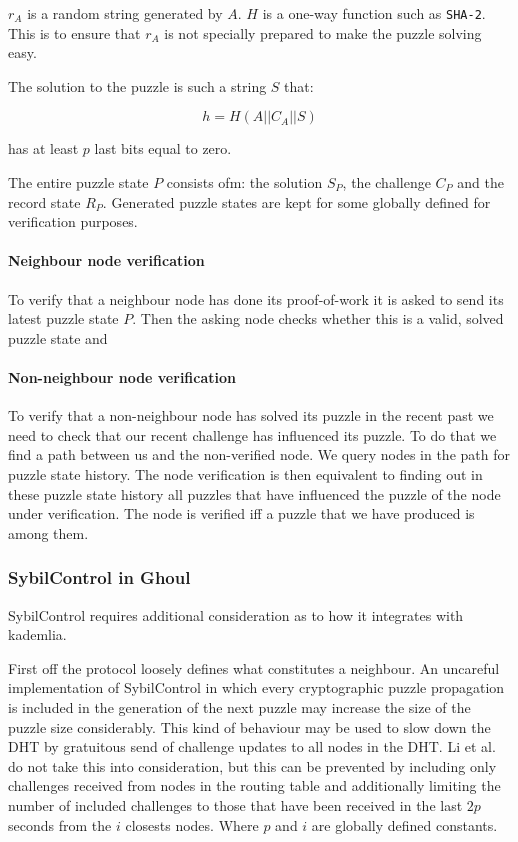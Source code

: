   $r_A$ is a random string generated by $A$. $H$ is a one-way function such as
  \texttt{SHA-2}. This is to ensure that $r_A$ is not specially prepared to make
  the puzzle solving easy.

  The solution to the puzzle is such a string $S$ that:

  \[ h = H\left(A||C_A||S\right)\]

  has at least $p$ last bits equal to zero.

  The entire puzzle state $P$ consists ofm: the solution $S_P$, the challenge
  $C_P$ and the record state $R_P$. Generated puzzle states are kept for some
  globally defined for verification purposes.

  \paragraph{Neighbour node verification}
  To verify that a neighbour node has done its proof-of-work it is asked to send
  its latest puzzle state $P$. Then the asking node checks whether this is a
  valid, solved puzzle state and 

  \paragraph{Non-neighbour node verification}
  To verify that a non-neighbour node has solved its puzzle in the recent past we
  need to check that our recent challenge has influenced its puzzle. To do that
  we find a path between us and the non-verified node. We query nodes in the
  path for puzzle state history. The node verification is then equivalent to
  finding out in these puzzle state history all puzzles that have influenced the
  puzzle of the node under verification. The node is verified iff a puzzle that
  we have produced is among them.

\subsubsection{SybilControl in Ghoul}
  SybilControl requires additional consideration as to how it integrates with
  kademlia.

  First off the protocol loosely defines what constitutes a neighbour. An
  uncareful implementation of SybilControl in which every cryptographic puzzle
  propagation is included in the generation of the next puzzle may increase the
  size of the puzzle size considerably. This kind of behaviour may be used to
  slow down the DHT by gratuitous send of challenge updates to all nodes in the
  DHT. Li et al. do not take this into consideration, but this can be prevented
  by including only challenges received from nodes in the routing table and
  additionally limiting the number of included challenges to those that have
  been received in the last $2p$ seconds from the $i$ closests nodes. Where $p$
  and $i$ are globally defined constants.

